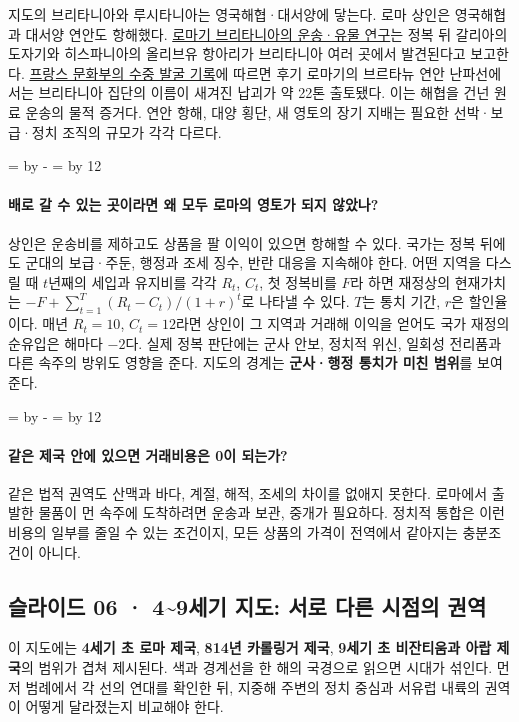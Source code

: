 \documentclass[10pt,a4paper]{article}
\newcommand{\ReserveQuestionSpace}{%
  \par\begingroup
  \dimen0=\pagegoal \advance\dimen0 by -\pagetotal
  \dimen2=\baselineskip \multiply\dimen2 by 12
  \ifdim\dimen0<\dimen2 \newpage\fi
  \endgroup}
\begin{document}
지도의 브리타니아와 루시타니아는 영국해협·대서양에 닿는다. 로마 상인은 영국해협과 대서양 연안도 항해했다. \href{https://www.cambridge.org/core/journals/european-journal-of-archaeology/article/transport-costs-and-economic-change-in-roman-britain/09FD867DD0C956EC284E538DDD72F36B}{로마기 브리타니아의 운송·유물 연구}는 정복 뒤 갈리아의 도자기와 히스파니아의 올리브유 항아리가 브리타니아 여러 곳에서 발견된다고 보고한다. \href{https://archeologie.culture.gouv.fr/archeo-sous-marine/en/ploumanach-wreck-cotes-darmor}{프랑스 문화부의 수중 발굴 기록}에 따르면 후기 로마기의 브르타뉴 연안 난파선에서는 브리타니아 집단의 이름이 새겨진 납괴가 약 22톤 출토됐다. 이는 해협을 건넌 원료 운송의 물적 증거다. 연안 항해, 대양 횡단, 새 영토의 장기 지배는 필요한 선박·보급·정치 조직의 규모가 각각 다르다.\par

\ReserveQuestionSpace
\paragraph{배로 갈 수 있는 곳이라면 왜 모두 로마의 영토가 되지 않았나?}
상인은 운송비를 제하고도 상품을 팔 이익이 있으면 항해할 수 있다. 국가는 정복 뒤에도 군대의 보급·주둔, 행정과 조세 징수, 반란 대응을 지속해야 한다. 어떤 지역을 다스릴 때 $t$년째의 세입과 유지비를 각각 $R_t$, $C_t$, 첫 정복비를 $F$라 하면 재정상의 현재가치는 $-F+\sum_{t=1}^{T}(R_t-C_t)/(1+r)^t$로 나타낼 수 있다. $T$는 통치 기간, $r$은 할인율이다. 매년 $R_t=10$, $C_t=12$라면 상인이 그 지역과 거래해 이익을 얻어도 국가 재정의 순유입은 해마다 $-2$다. 실제 정복 판단에는 군사 안보, 정치적 위신, 일회성 전리품과 다른 속주의 방위도 영향을 준다. 지도의 경계는 \textbf{군사·행정 통치가 미친 범위}를 보여 준다.\par

\ReserveQuestionSpace
\paragraph{같은 제국 안에 있으면 거래비용은 0이 되는가?}
같은 법적 권역도 산맥과 바다, 계절, 해적, 조세의 차이를 없애지 못한다. 로마에서 출발한 물품이 먼 속주에 도착하려면 운송과 보관, 중개가 필요하다. 정치적 통합은 이런 비용의 일부를 줄일 수 있는 조건이지, 모든 상품의 가격이 전역에서 같아지는 충분조건이 아니다.\par

\subsection{슬라이드 06 · 4\textasciitilde{}9세기 지도: 서로 다른 시점의 권역}
이 지도에는 \textbf{4세기 초 로마 제국}, \textbf{814년 카롤링거 제국}, \textbf{9세기 초 비잔티움과 아랍 제국}의 범위가 겹쳐 제시된다. 색과 경계선을 한 해의 국경으로 읽으면 시대가 섞인다. 먼저 범례에서 각 선의 연대를 확인한 뒤, 지중해 주변의 정치 중심과 서유럽 내륙의 권역이 어떻게 달라졌는지 비교해야 한다.\par
\end{document}
